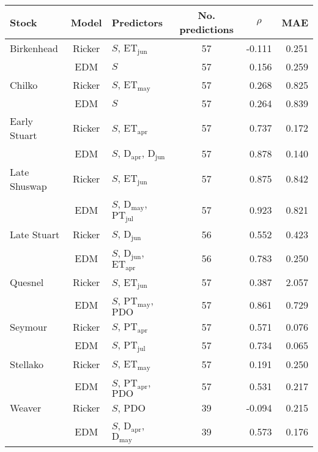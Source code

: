 \begin{tabular}{lclcrr}
\hline
Stock & Model & Predictors & No. predictions & \multicolumn{1}{c}{$\rho$} &  \multicolumn{1}{c}{MAE} \\
\hline
Birkenhead & Ricker & $S$, $\mathrm{ET}_{\mathrm{jun}}$ & 57 & -0.111 & 0.251 \\
& EDM & $S$ & 57 & 0.156 & 0.259 \\
Chilko & Ricker & $S$, $\mathrm{ET}_{\mathrm{may}}$ & 57 & 0.268 & 0.825 \\
& EDM & $S$ & 57 & 0.264 & 0.839 \\
Early Stuart & Ricker & $S$, $\mathrm{ET}_{\mathrm{apr}}$ & 57 & 0.737 & 0.172 \\
& EDM & $S$, $\mathrm{D}_{\mathrm{apr}}$, $\mathrm{D}_{\mathrm{jun}}$ & 57 & 0.878 & 0.140 \\
Late Shuswap & Ricker & $S$, $\mathrm{ET}_{\mathrm{jun}}$ & 57 & 0.875 & 0.842 \\
& EDM & $S$, $\mathrm{D}_{\mathrm{may}}$, $\mathrm{PT}_{\mathrm{jul}}$ & 57 & 0.923 & 0.821 \\
Late Stuart & Ricker & $S$, $\mathrm{D}_{\mathrm{jun}}$ & 56 & 0.552 & 0.423 \\
& EDM & $S$, $\mathrm{D}_{\mathrm{jun}}$, $\mathrm{ET}_{\mathrm{apr}}$ & 56 & 0.783 & 0.250 \\
Quesnel & Ricker & $S$, $\mathrm{ET}_{\mathrm{jun}}$ & 57 & 0.387 & 2.057 \\
& EDM & $S$, $\mathrm{PT}_{\mathrm{may}}$, $\mathrm{PDO}$ & 57 & 0.861 & 0.729 \\
Seymour & Ricker & $S$, $\mathrm{PT}_{\mathrm{apr}}$ & 57 & 0.571 & 0.076 \\
& EDM & $S$, $\mathrm{PT}_{\mathrm{jul}}$ & 57 & 0.734 & 0.065 \\
Stellako & Ricker & $S$, $\mathrm{ET}_{\mathrm{may}}$ & 57 & 0.191 & 0.250 \\
& EDM & $S$, $\mathrm{PT}_{\mathrm{apr}}$, $\mathrm{PDO}$ & 57 & 0.531 & 0.217 \\
Weaver & Ricker & $S$, $\mathrm{PDO}$ & 39 & -0.094 & 0.215 \\
& EDM & $S$, $\mathrm{D}_{\mathrm{apr}}$, $\mathrm{D}_{\mathrm{may}}$ & 39 & 0.573 & 0.176 \\
\hline
\end{tabular}